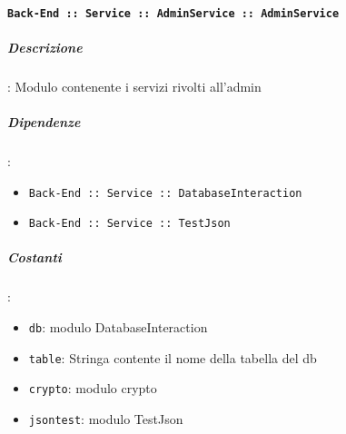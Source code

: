 \documentclass[../DefinizioneDiProdotto_v3.0.0.tex]{subfiles}
\begin{document}
\paragraph{\texttt{Back-End :: Service :: AdminService :: AdminService}}
\subparagraph{Descrizione}: Modulo contenente i servizi rivolti all'admin
\subparagraph{Dipendenze}:
\begin{itemize}
	\item \texttt{Back-End :: Service :: DatabaseInteraction}
	\item \texttt{Back-End :: Service :: TestJson}
\end{itemize}
\subparagraph{Costanti}:
\begin{itemize}
	\item \texttt{db}: modulo DatabaseInteraction
	\item \texttt{table}: Stringa contente il nome della tabella del db
	\item \texttt{crypto}: modulo crypto
	\item \texttt{jsontest}: modulo TestJson
\end{itemize}
\end{document}
